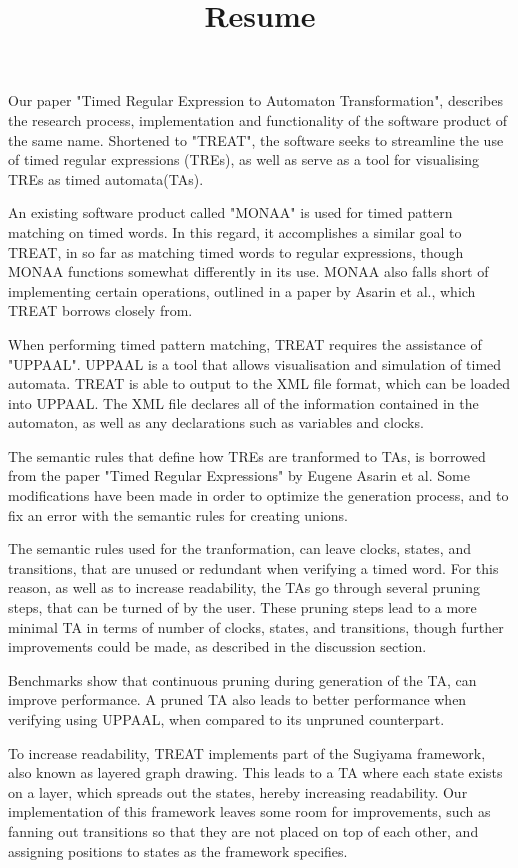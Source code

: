\documentclass{article}
\begin{document}
\title{Resume}

Our paper "Timed Regular Expression to Automaton Transformation", describes the research process, implementation and functionality of the software product of the same name.
Shortened to "TREAT", the software seeks to streamline the use of timed regular expressions (TREs), as well as serve as a tool for visualising TREs as timed automata(TAs).

An existing software product called "MONAA" is used for timed pattern matching on timed words. In this regard, it accomplishes a similar goal to TREAT, in so far as matching timed words to regular expressions, though MONAA functions somewhat differently in its use.
MONAA also falls short of implementing certain operations, outlined in a paper by Asarin et al., which TREAT borrows closely from.

When performing timed pattern matching, TREAT requires the assistance of "UPPAAL". UPPAAL is a tool that allows visualisation and simulation of timed automata. 
TREAT is able to output to the XML file format, which can be loaded into UPPAAL. The XML file declares all of the information contained in the automaton, as well as any declarations such as variables and clocks.

The semantic rules that define how TREs are tranformed to TAs, is borrowed from the paper "Timed Regular Expressions" by Eugene Asarin et al. Some modifications have been made in order to optimize the generation process, and to fix an error with the semantic rules for creating unions.

The semantic rules used for the tranformation, can leave clocks, states, and transitions, that are unused or redundant when verifying a timed word. For this reason, as well as to increase readability, the TAs go through several pruning steps, that can be turned of by the user.
These pruning steps lead to a more minimal TA in terms of number of clocks, states, and transitions, though further improvements could be made, as described in the discussion section.

Benchmarks show that continuous pruning during generation of the TA, can improve performance. A pruned TA also leads to better performance when verifying using UPPAAL, when compared to its unpruned counterpart.

To increase readability, TREAT implements part of the Sugiyama framework, also known as layered graph drawing. This leads to a TA where each state exists on a layer, which spreads out the states, hereby increasing readability. Our implementation of this framework leaves some room for improvements, such as fanning out transitions so that they are not placed on top of each other, and assigning positions to states as the framework specifies.
\end{document}
